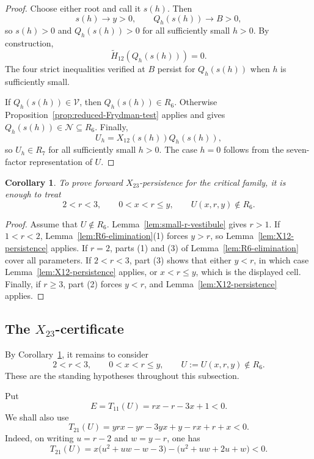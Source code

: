 \documentclass[11pt,onecolumn]{amsart}
\theoremstyle{plain}
\newtheorem{corollary}[theorem]{Corollary}
\theoremstyle{definition}
\theoremstyle{remark}
\newcommand{\V}{\mathcal V}
\newcommand{\NH}{\mathcal N}
\begin{document}
\begin{proof}
	Choose either root and call it $s(h)$.  Then
	\[
	s(h)\to y>0,
	\qquad
	Q_h(s(h))\to B>0,
	\]
	so $s(h)>0$ and $Q_h(s(h))>0$ for all sufficiently small $h>0$.
	By construction,
	\[
	\widetilde H_{12}(Q_h(s(h)))=0.
	\]
	The four strict inequalities verified at $B$ persist for
	$Q_h(s(h))$ when $h$ is sufficiently small.
	
	If $Q_h(s(h))\in\V$, then $Q_h(s(h))\in R_6$.  Otherwise
	Proposition~\ref{prop:reduced-Frydman-test} applies and gives
	$Q_h(s(h))\in\NH\subseteq R_6$.  Finally,
	\[
	U_h=X_{12}(s(h))Q_h(s(h)),
	\]
	so $U_h\in R_7$ for all sufficiently small $h>0$.  The case $h=0$
	follows from the  seven-factor representation of $U$.
\end{proof}





\begin{corollary}
\label{cor:remaining-hard-cell}
To prove forward $X_{23}$-persistence for the critical family, it is
enough to treat
\[
2<r<3,
\qquad
0<x<r\leq y,
\qquad
U(x,r,y)\notin R_6.
\]\end{corollary}

\begin{proof}
Assume that $U\notin R_6$. Lemma~\ref{lem:small-r-vestibule} gives
$r>1$. If $1<r<2$, Lemma~\ref{lem:R6-elimination}(1) forces $y>r$, so
Lemma~\ref{lem:X12-persistence} applies. If $r=2$, parts (1) and (3) of
Lemma~\ref{lem:R6-elimination} cover all parameters. If $2<r<3$, part
(3) shows that either $y<r$, in which case
Lemma~\ref{lem:X12-persistence} applies, or $x<r\leq y$, which is the displayed cell. 
Finally, if $r\geq3$,
part (2) forces $y<r$, and Lemma~\ref{lem:X12-persistence} applies.
\end{proof}

\subsection{\texorpdfstring{The $X_{23}$-certificate}{The X23-certificate}}
\label{subsec:X23-certificate}

By Corollary~\ref{cor:remaining-hard-cell}, it remains to consider
\[
2<r<3,
\qquad
0<x<r\leq y,
\qquad
U:=U(x,r,y)\notin R_6.
\]
These are the standing hypotheses throughout this subsection.

Put
\[
E=T_{11}(U)=rx-r-3x+1<0.
\]
We shall also use
\[
T_{21}(U)=yrx-yr-3yx+y-rx+r+x<0.
\]
Indeed, on writing $u=r-2$ and $w=y-r$, one has
\[
T_{21}(U)
=x\bigl(u^2+uw-w-3\bigr)
 -\bigl(u^2+uw+2u+w\bigr)<0.
\]
\end{document}
